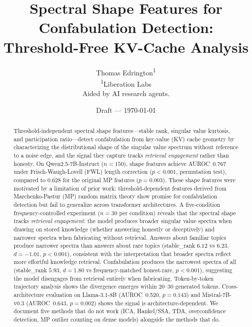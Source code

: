 \documentclass[11pt,a4paper]{article}
\title{Spectral Shape Features for Confabulation Detection:\\
Threshold-Free KV-Cache Analysis}
\author{
Thomas Edrington\textsuperscript{1}\\[4pt]
\textsuperscript{1}Liberation Labs\\
Aided by AI research agents.
}
\date{Draft --- \today}
\begin{document}
\maketitle

\begin{abstract}

Threshold-independent spectral shape features---stable rank, singular
value kurtosis, and participation ratio---detect confabulation from
key-value (KV) cache geometry by characterizing the distributional
shape of the singular value spectrum without reference to a noise
edge, and the signal they capture tracks \emph{retrieval engagement}
rather than honesty. On Qwen2.5-7B-Instruct ($n=150$), shape features
achieve AUROC~0.767 under Frisch-Waugh-Lovell (FWL) length correction \citep{frisch1933partial,lovell1963seasonal}
($p < 0.001$, permutation test), compared to 0.628 for the original
MP features ($p = 0.003$). These shape features were motivated by a
limitation of prior work: threshold-dependent features derived from
Marchenko-Pastur (MP) random matrix theory show promise for
confabulation detection but fail to generalize across transformer
architectures. A five-condition frequency-controlled
experiment ($n=30$ per condition) reveals that the spectral shape
tracks \emph{retrieval engagement}: the model produces broader
singular value spectra when drawing on stored knowledge (whether
answering honestly or deceptively) and narrower spectra when
fabricating without retrieval. Answers about familiar topics produce
narrower spectra than answers about rare topics
(stable\_rank $6.12$ vs $6.23$, $d = -1.01$, $p < 0.001$),
consistent with the interpretation that broader spectra reflect more
effortful knowledge retrieval. Confabulation produces the narrowest
spectra of all (stable\_rank $5.93$, $d = 1.80$ vs
frequency-matched honest-rare, $p < 0.001$), suggesting the model
disengages from retrieval entirely when fabricating. Token-by-token
trajectory analysis shows the divergence emerges within 20--30
generated tokens. Cross-architecture evaluation on Llama-3.1-8B
(AUROC~0.520, $p = 0.143$) and Mistral-7B-v0.3 (AUROC~0.643, $p = 0.002$) shows the signal is
architecture-dependent. We document five methods that do not work
(ICA, Hankel/SSA, TDA, overconfidence detection, MP outlier counting
on dense models) alongside the methods that do.

\end{abstract}
\end{document}
